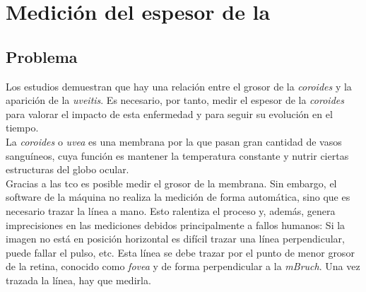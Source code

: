 \chapter{Medición del espesor de la }
\section{Problema}
Los estudios demuestran que hay una relación entre el grosor de la
\emph{\gls{coroides}} y la aparición de la \emph{\gls{uveitis}}. Es
necesario, por tanto, medir el espesor de la \emph{\gls{coroides}}
para valorar el impacto de esta enfermedad y para seguir su evolución
en el tiempo.\\
La \emph{\gls{coroides}} o \emph{\gls{uvea}} es una membrana por la
que pasan gran cantidad de vasos sanguíneos, cuya función es mantener
la temperatura
constante y nutrir ciertas estructuras del globo ocular. \\
Gracias a las \gls{tco} es posible medir el grosor de la membrana. Sin
embargo, el software de la máquina no realiza la medición de forma
automática, sino que es necesario trazar la línea a mano. Esto
ralentiza el proceso y, además, genera imprecisiones en las mediciones
debidos principalmente a fallos humanos: Si la imagen no está en
posición horizontal es difícil trazar una línea perpendicular, puede
fallar el pulso, etc. Esta línea se debe trazar por el punto de menor
grosor de la retina, conocido como \emph{\gls{fovea}} y de forma
perpendicular a la \emph{\gls{mBruch}}. Una vez trazada la línea, hay
que medirla.


